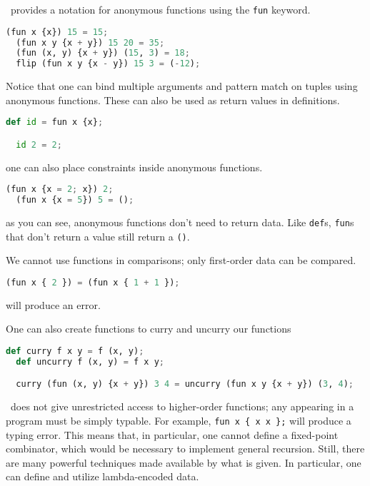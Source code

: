 \vampir\ provides a notation for anonymous functions using the \lstinline{fun} keyword.

\begin{lstlisting}[language=Python]
  (fun x {x}) 15 = 15;
  (fun x y {x + y}) 15 20 = 35;
  (fun (x, y) {x + y}) (15, 3) = 18;
  flip (fun x y {x - y}) 15 3 = (-12);
\end{lstlisting}

Notice that one can bind multiple arguments and pattern match on tuples using anonymous functions. These can also be used as return values in definitions.

\begin{lstlisting}[language=Python]
  def id = fun x {x};

  id 2 = 2;
\end{lstlisting}

one can also place constraints inside anonymous functions.

\begin{lstlisting}[language=Python]
  (fun x {x = 2; x}) 2;
  (fun x {x = 5}) 5 = ();
\end{lstlisting}

as you can see, anonymous functions don't need to return data. Like \lstinline{def}s, \lstinline{fun}s that don't return a value still return a \lstinline{()}.

We cannot use functions in comparisons; only first-order data can be compared. 

\begin{lstlisting}[language=Python]
  (fun x { 2 }) = (fun x { 1 + 1 });
\end{lstlisting}

will produce an error.

One can also create functions to curry and uncurry our functions

\begin{lstlisting}[language=Python]
  def curry f x y = f (x, y);
  def uncurry f (x, y) = f x y;

  curry (fun (x, y) {x + y}) 3 4 = uncurry (fun x y {x + y}) (3, 4);
\end{lstlisting}

\vampir\ does not give unrestricted access to higher-order functions; any appearing in a program must be simply typable. For example, \lstinline|fun x { x x };| will produce a typing error. This means that, in particular, one cannot define a fixed-point combinator, which would be necessary to implement general recursion. Still, there are many powerful techniques made available by what is given. In particular, one can define and utilize lambda-encoded data.

